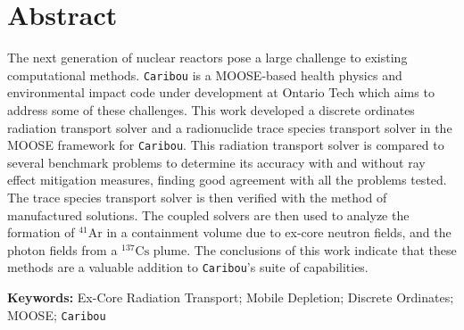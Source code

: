 \chapter*{Abstract}

The next generation of nuclear reactors pose a large challenge to existing computational methods. \texttt{Caribou} is a MOOSE-based health physics and environmental impact code under development at Ontario Tech which aims to address some of these challenges. This work developed a discrete ordinates radiation transport solver and a radionuclide trace species transport solver in the MOOSE framework for \texttt{Caribou}. This radiation transport solver is compared to several benchmark problems to determine its accuracy with and without ray effect mitigation measures, finding good agreement with all the problems tested. The trace species transport solver is then verified with the method of manufactured solutions. The coupled solvers are then used to analyze the formation of $\mathrm{^{41}Ar}$ in a containment volume due to ex-core neutron fields, and the photon fields from a $\mathrm{^{137}Cs}$ plume. The conclusions of this work indicate that these methods are a valuable addition to \texttt{Caribou}'s suite of capabilities.

\bigskip
\bigskip
\bigskip
\bigskip

\noindent \textbf{Keywords:} Ex-Core Radiation Transport; Mobile Depletion; Discrete Ordinates; MOOSE; \texttt{Caribou}